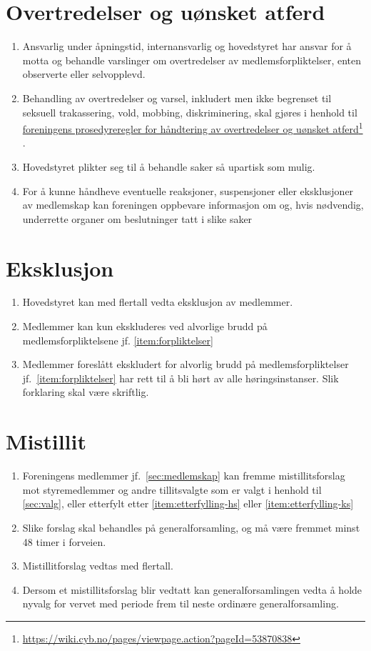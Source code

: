 \documentclass[8pt,norsk,a4paper]{article}
\newcommand\fhref[2]{%
	\href{#1}{#2}\footnote{\url{#1}}%
}
\begin{document}
\section{Overtredelser og uønsket atferd}
\begin{enumerate}
	\item Ansvarlig under åpningstid, internansvarlig og hovedstyret har ansvar for å motta og behandle varslinger om overtredelser av medlemsforpliktelser, enten observerte eller selvopplevd.
	\item Behandling av overtredelser og varsel, inkludert men ikke begrenset til seksuell trakassering, vold, mobbing, diskriminering, skal gjøres i henhold til \fhref{https://wiki.cyb.no/pages/viewpage.action?pageId=53870838}{foreningens prosedyreregler for håndtering av overtredelser og uønsket atferd}.
	\item Hovedstyret plikter seg til å behandle saker så upartisk som mulig.
	\item For å kunne håndheve eventuelle reaksjoner, suspensjoner eller eksklusjoner av medlemskap kan foreningen oppbevare informasjon om og, hvis nødvendig, underrette organer om beslutninger tatt i slike saker
\end{enumerate}

\section{Eksklusjon}\label{sec:eksklusjon}
\begin{enumerate}
	\item Hovedstyret kan med  flertall vedta eksklusjon av medlemmer.
	\item Medlemmer kan kun ekskluderes ved alvorlige brudd på medlemsforpliktelsene jf. \ref{item:forpliktelser}
	\item Medlemmer foreslått ekskludert for alvorlig brudd på medlemsforpliktelser jf.~\ref{item:forpliktelser} har rett til å bli hørt av alle høringsinstanser. Slik forklaring skal være skriftlig.
\end{enumerate}

\section{Mistillit}\label{sec:mistillit}
\begin{enumerate}
	\item{Foreningens medlemmer jf.~\ref{sec:medlemskap} kan fremme mistillitsforslag mot styremedlemmer og andre tillitsvalgte som er valgt i henhold til \ref{sec:valg}, eller etterfylt etter \ref{item:etterfylling-hs} eller \ref{item:etterfylling-ks}}
	\item{Slike forslag skal behandles på generalforsamling, og må være fremmet minst 48 timer i forveien.}
	\item{Mistillitforslag vedtas med  flertall.}
	\item{Dersom et mistillitsforslag blir vedtatt kan generalforsamlingen vedta å holde nyvalg for vervet med periode frem til neste ordinære generalforsamling.}
\end{enumerate}
\end{document}
